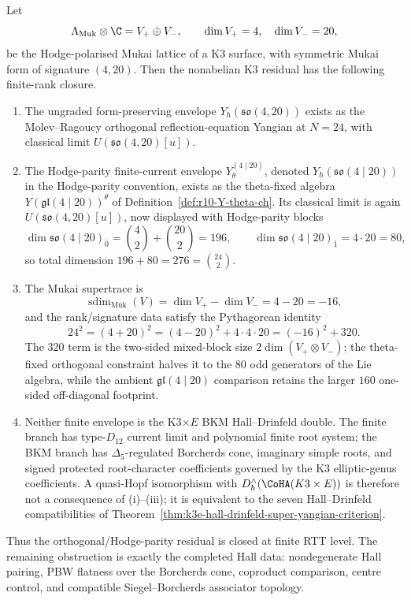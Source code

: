 \begin{theorem}
\label{thm:k3-mukai-orthogonal-finite-closure}
Let
\[
 \Lambda_{\mathrm{Muk}}\otimes\C
 = V_+ \oplus V_-,
 \qquad
 \dim V_+ = 4,\quad \dim V_- = 20,
\]
be the Hodge-polarised Mukai lattice of a K3 surface, with symmetric
Mukai form of signature $(4,20)$. Then the nonabelian K3 residual
has the following finite-rank closure.
\begin{enumerate}[label=\textup{(\roman*)}]
\item The ungraded form-preserving envelope
 $Y_\hbar(\mathfrak{so}(4,20))$ exists as the Molev--Ragoucy
 orthogonal reflection-equation Yangian at $N=24$, with classical
 limit $U(\mathfrak{so}(4,20)[u])$.
\item The Hodge-parity finite-current envelope
 \(Y_\theta^{(4\mid20)}\), denoted
 \(Y_\hbar(\mathfrak{so}(4\mid20))\) in the Hodge-parity convention,
 exists as the theta-fixed algebra
 \(Y(\mathfrak{gl}(4\mid20))^\theta\) of
 Definition~\ref{def:r10-Y-theta-ch}. Its classical limit is again
 $U(\mathfrak{so}(4,20)[u])$, now displayed with
 Hodge-parity blocks
 \[
 \dim\mathfrak{so}(4\mid20)_{\bar 0}
 = \binom{4}{2}+\binom{20}{2}=196,
 \qquad
 \dim\mathfrak{so}(4\mid20)_{\bar 1}=4\cdot20=80,
 \]
 so total dimension $196+80=276=\binom{24}{2}$.
\item The Mukai supertrace is
 \[
 \operatorname{sdim}_{\mathrm{Muk}}(V)
 = \dim V_+-\dim V_-=4-20=-16,
 \]
 and the rank/signature data satisfy the Pythagorean identity
 \[
 24^2=(4+20)^2=(4-20)^2+4\cdot4\cdot20
 =(-16)^2+320.
 \]
 The $320$ term is the two-sided mixed-block size
 $2\dim(V_+\otimes V_-)$; the theta-fixed orthogonal constraint halves
 it to the $80$ odd generators of the Lie algebra, while the ambient
 $\mathfrak{gl}(4\mid20)$ comparison retains the larger $160$ one-sided
 off-diagonal footprint.
\item Neither finite envelope is the K3$\times E$ BKM Hall--Drinfeld
 double. The finite branch has type-$D_{12}$ current limit and
 polynomial finite root system; the BKM branch has
 $\Delta_5$-regulated Borcherds cone, imaginary simple roots, and
 signed protected root-character coefficients governed by the K3
 elliptic-genus coefficients. A
 quasi-Hopf isomorphism with
 $D^\wedge_\hbar(\CoHA(K3\times E))$ is therefore not a consequence
 of \textup{(i)}--\textup{(iii)}; it is equivalent to the seven
 Hall--Drinfeld compatibilities of
 Theorem~\ref{thm:k3e-hall-drinfeld-super-yangian-criterion}.
\end{enumerate}
Thus the orthogonal/Hodge-parity residual is closed at finite
RTT level. The remaining obstruction is exactly the completed
Hall data: nondegenerate Hall pairing, PBW flatness over the
Borcherds cone, coproduct comparison, centre control, and compatible
Siegel--Borcherds associator topology.
\end{theorem}

